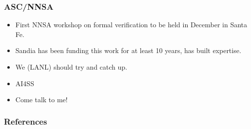 \documentclass[usenames,dvipsnames]{beamer}
\begin{document}
\begin{frame}
\frametitle{ASC/NNSA}
\begin{itemize}[<+->]
\item First NNSA workshop on formal verification to be held in December in Santa Fe.
\item Sandia has been funding this work for at least 10 years, has built expertise.
\item We (LANL) should try and catch up.
\item AI4SS 
\item Come talk to me!
\end{itemize}
\end{frame}

\begin{frame}
\frametitle{References}
\printbibliography
\end{frame}
\end{document}
